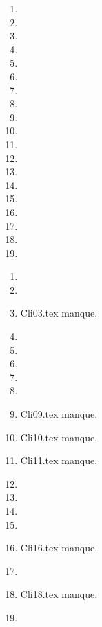  
 
\begin{enumerate}
  \item  
  \item  
  \item  
  \item  
  \item  
  \item  
  \item  
  \item  
  \item  
  \item  
  \item  
  \item  
  \item  
  \item  
  \item  
  \item  
  \item  
  \item  
  \item  
\end{enumerate} 
\clearpage 
{}
\begin{enumerate}
  \item  
  \item  
  \item Cli03.tex manque. 
  \item  
  \item  
  \item  
  \item  
  \item  
  \item Cli09.tex manque. 
  \item Cli10.tex manque. 
  \item Cli11.tex manque. 
  \item  
  \item  
  \item  
  \item  
  \item Cli16.tex manque. 
  \item  
  \item Cli18.tex manque. 
  \item  
\end{enumerate} 
